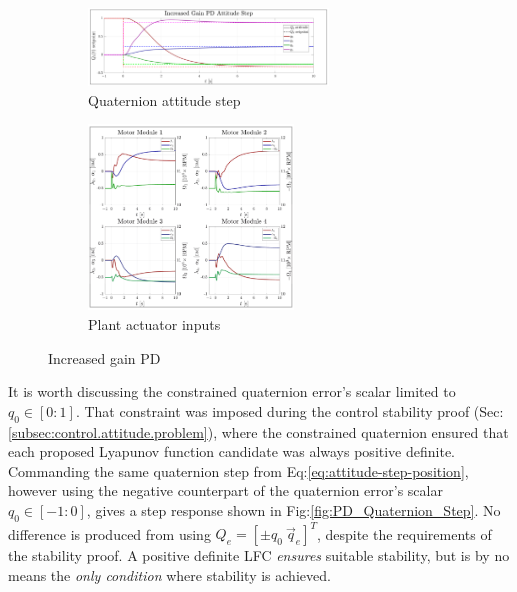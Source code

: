\begin{figure}[htbp]
\vspace{-10pt}
\centering
\begin{subfigure}{\textwidth}
\centering
\includegraphics[width=0.7\textwidth]{graphs/PD_Diagonal_Gain_Step}
\vspace{-6pt}
\caption{Quaternion attitude step}
\label{fig:PD_Diagonal_Gain_Step}
\end{subfigure}
\begin{subfigure}{\textwidth}
\centering
\includegraphics[width=0.6\textwidth]{graphs/PD_Diagonal_Gain_Input}
\vspace{-8pt}
\caption{Plant actuator inputs}
\label{fig:PD_Diagonal_Gain_Input}
\end{subfigure}
\vspace{-8pt}
\caption{Increased gain PD}
\vspace{-16pt}
\end{figure}
\par
It is worth discussing the constrained quaternion error's scalar limited to $q_0\in[0:1]$. That constraint was imposed during the control stability proof (Sec:\ref{subsec:control.attitude.problem}), where the constrained quaternion ensured that each proposed Lyapunov function candidate was always positive definite. Commanding the same quaternion step from Eq:\ref{eq:attitude-step-position}, however using the negative counterpart of the quaternion error's scalar  $q_0\in[-1:0]$, gives a step response shown in Fig:\ref{fig:PD_Quaternion_Step}. No difference is produced from using $Q_e=[\pm q_0~\vec{q}_e]^T$, despite the requirements of the stability proof. A positive definite LFC \emph{ensures} suitable stability, but is by no means the \emph{only condition} where stability is achieved.
